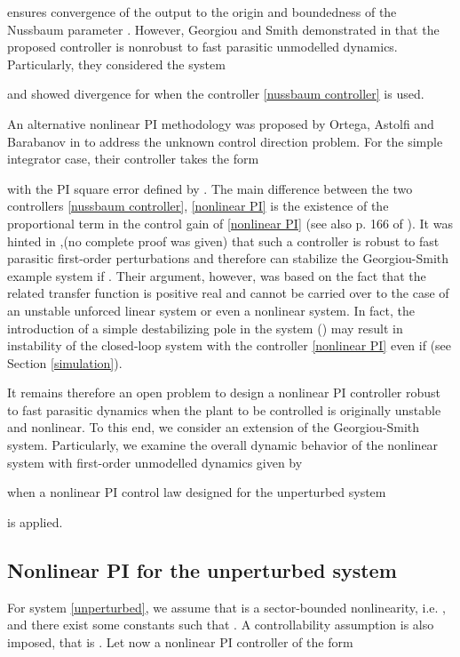 \documentclass[preprint,12pt]{article}
\begin{document}
ensures convergence of the output  to the origin and boundedness of the Nussbaum parameter . However, Georgiou and Smith demonstrated in \cite{GS} that the proposed controller is nonrobust to fast parasitic unmodelled dynamics. Particularly, they considered the  system

and showed divergence for  when the controller \eqref{nussbaum controller} is used.

An alternative nonlinear PI methodology was proposed by Ortega, Astolfi and Barabanov  in \cite{Ortega_paper} to address the unknown control direction problem. For the simple integrator case, their controller takes the form

with  the PI square error defined by . The main difference between the two controllers \eqref{nussbaum controller}, \eqref{nonlinear PI}  is the existence of the proportional term in the control gain of \eqref{nonlinear PI} (see also p. 166 of \cite{AKO_book}). It was hinted  in \cite{Ortega_paper},\cite{AKO_book}(no complete proof was given) that such a controller is robust to fast parasitic first-order perturbations and therefore can stabilize the Georgiou-Smith example system if . Their argument, however, was based on the fact that the related transfer function is  positive real and cannot be carried over to the case of an unstable unforced linear system or even a nonlinear system. In fact, the introduction of a simple destabilizing pole in the system 
() may result in instability of the closed-loop system with the controller \eqref{nonlinear PI} even if  (see Section \ref{simulation}).

It remains therefore an open problem to design a nonlinear PI controller   robust to fast parasitic dynamics when the plant to be controlled is originally unstable and nonlinear. To this end, we consider an extension of the Georgiou-Smith  system. Particularly, we examine the overall dynamic behavior  of  the  nonlinear system  with first-order unmodelled dynamics given by

when a nonlinear PI control law  designed for the unperturbed system

is applied.
\subsection{Nonlinear PI for the unperturbed system}
For system \eqref{unperturbed}, we assume that 
is a sector-bounded nonlinearity, i.e. ,  and there exist some constants  such that  .
A controllability assumption is also imposed, that is .
Let now a nonlinear PI controller of the form
\end{document}
